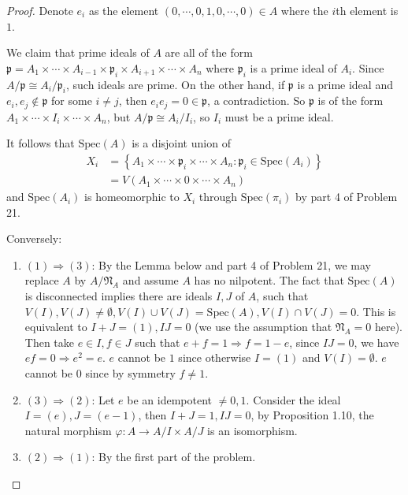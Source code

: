 \documentclass{solution}
\begin{document}
\begin{proof}
    Denote $e_i$ as the element $(0, \cdots, 0, 1, 0, \cdots, 0) \in A$ where the $i$th element is $1$.

    We claim that prime ideals of $A$ are all of the form $\mathfrak{p} = A_1 \times \cdots \times A_{i - 1} \times \mathfrak{p}_i \times A_{i + 1} \times \cdots \times A_n$ where $\mathfrak{p}_i$ is a prime ideal of $A_i$. Since $A / \mathfrak{p} \cong A_i / \mathfrak{p}_i$, such ideals are prime. On the other hand, if $\mathfrak{p}$ is a prime ideal and $e_i, e_j \notin \mathfrak{p}$ for some $i \ne j$, then $e_ie_j = 0 \in \mathfrak{p}$, a contradiction. So $\mathfrak{p}$ is of the form $A_1 \times \cdots \times I_i \times \cdots \times A_n$, but $A / \mathfrak{p} \cong A_i / I_i$, so $I_i$ must be a prime ideal.

    It follows that $\mathrm{Spec}(A)$ is a disjoint union of
    $$
        \begin{aligned}
        X_i &= \left\lbrace A_1 \times \cdots \times \mathfrak{p}_i \times \cdots \times A_n : \mathfrak{p}_i \in \mathrm{Spec}(A_i)\right\rbrace \\
        &= V(A_1 \times \cdots \times 0 \times \cdots \times A_n)
        \end{aligned}
    $$
    and $\mathrm{Spec}(A_i)$ is homeomorphic to $X_i$ through $\mathrm{Spec}(\pi_i)$ by part 4 of Problem 21.

    Conversely:
    \begin{enumerate}
        \item $(1) \Rightarrow (3)$: By the Lemma below and part 4 of Problem 21, we may replace $A$ by $A / \mathfrak{N}_A$ and assume $A$ has no nilpotent. The fact that $\mathrm{Spec}(A)$ is disconnected implies there are ideals $I, J$ of $A$, such that $V(I), V(J) \ne \emptyset, V(I) \cup V(J) = \mathrm{Spec}(A), V(I) \cap V(J) = 0$. This is equivalent to $I + J = (1), I J = 0$ (we use the assumption that $\mathfrak{N}_A = 0$ here). Then take $e \in I, f \in J$ such that $e + f = 1 \Rightarrow f = 1 - e$, since $IJ = 0$, we have $ef = 0 \Rightarrow e^2 = e$. $e$ cannot be $1$ since otherwise $I = (1)$ and $V(I) = \emptyset$. $e$ cannot be $0$ since by symmetry $f \ne 1$.
        \item $(3) \Rightarrow (2)$: Let $e$ be an idempotent $\ne 0, 1$. Consider the ideal $I = (e), J = (e - 1)$, then $I + J = 1, IJ = 0$, by Proposition 1.10, the natural morphism $\varphi: A \rightarrow A / I \times A / J$ is an isomorphism.
        \item $(2) \Rightarrow (1)$: By the first part of the problem.
    \end{enumerate}
\end{proof}
\end{document}
